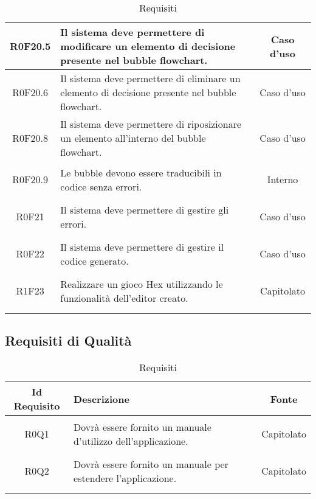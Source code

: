 \documentclass[../AnalisiDeiRequisiti.tex]{subfiles}
\begin{document}
\begin{longtable}{|c|>{\centering}p{7cm}|c|}
\hypertarget{R0F20.5}{R0F20.5} & Il sistema deve permettere di modificare un elemento di decisione presente nel bubble flowchart. & Caso d'uso \\ \hline
\hypertarget{R0F20.6}{R0F20.6} & Il sistema deve permettere di eliminare un elemento di decisione presente nel bubble flowchart. & Caso d'uso \\ \hline
\hypertarget{R0F20.8}{R0F20.8} & Il sistema deve permettere di riposizionare un elemento all'interno del bubble flowchart. & Caso d'uso \\ \hline
\hypertarget{R0F20.9}{R0F20.9} & Le bubble devono essere traducibili in codice senza errori. & Interno \\ \hline
\hypertarget{R0F21}{R0F21} & Il sistema deve permettere di gestire gli errori. & Caso d'uso \\ \hline
\hypertarget{R0F22}{R0F22} & Il sistema deve permettere di gestire il codice generato. & Caso d'uso \\ \hline
\hypertarget{R1F23}{R1F23} & Realizzare un gioco Hex utilizzando le funzionalità dell'editor creato. & Capitolato \\ \hline

\caption[Requisiti]{Requisiti}
\label{tabella:req0}
\end{longtable}
\clearpage
\subsection{Requisiti di Qualità}
\normalsize
\begin{longtable}{|c|>{\centering}p{7cm}|c|}
	\hline
	\textbf{Id Requisito} & \textbf{Descrizione} & \textbf{Fonte}\\
	\hline
	\endhead
	\hypertarget{R0Q1}{R0Q1} & Dovrà essere fornito un manuale d'utilizzo dell'applicazione. & Capitolato \\ \hline
	\hypertarget{R0Q2}{R0Q2} & Dovrà essere fornito un manuale per estendere l'applicazione. & Capitolato \\ \hline
	\caption[Requisiti]{Requisiti}
	\label{tabella:req1}
\end{longtable}
\clearpage
\end{document}
